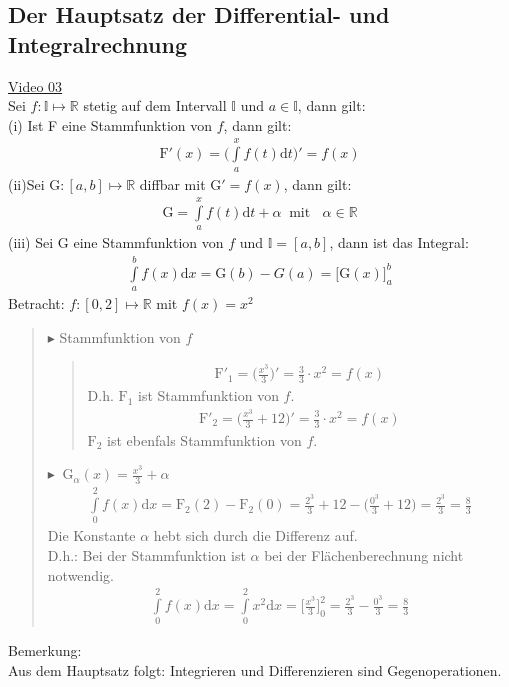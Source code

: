 \subsection{Der Hauptsatz der Differential- und Integralrechnung}
\href{https://youtu.be/2v6KdCjGNc0}{Video 03}\\
Sei $ f: \mathbb{I}\longmapsto \mathbb{R} $ stetig auf dem Intervall $  \mathbb{I} $ und $ a\in \mathbb{I} $, dann gilt:\\
(i) Ist F eine Stammfunktion von $ f $, dann gilt:\\
\begin{align*}
\mathrm{F}'(x)=\bigg(\int\limits_{a}^{x}f(t)\mathrm{d}t \bigg)'=f(x)
\end{align*}
(ii)\;Sei $ \mathrm{G}:[a,b]\longmapsto \mathbb{R} $ diffbar mit $ \mathrm{G}'=f(x) $, dann gilt:\\
\begin{align*}
\mathrm{G}=\int\limits_{a}^{x} f(t)\mathrm{d}t+\alpha\;\;\text{mit }\;\;\alpha\in\mathbb{R}
\end{align*}
(iii)\; Sei G eine Stammfunktion von $ f $ und $  \mathbb{I}=[a,b] $, dann ist das Integral:\\
\begin{align*}
\int\limits_{a}^{b} f(x)\mathrm{d}x=\mathrm{G}(b)-G(a)=\bigg[\mathrm{G}(x)\bigg]^b_a
\end{align*}
\newpage
Betracht: $ f:[0,2]\longmapsto\mathbb{R} $ mit $ f(x)=x^2 $ \\
\begin{quote}
	$\blacktriangleright$ Stammfunktion von $ f $\\
	\begin{quote}
		\begin{align*}
		\mathrm{F}'_1=\bigg(\frac{x^3}{3}\bigg)'=\frac{3}{3}\cdot x^2=f(x)
		\end{align*}
		D.h. $ \mathrm{F}_1 $ ist Stammfunktion von $ f $.
		\begin{align*}
		\mathrm{F}'_2=\bigg(\frac{x^3}{3}+12\bigg)'=\frac{3}{3}\cdot x^2=f(x)
		\end{align*}
		$ \mathrm{F}_2 $ ist ebenfals Stammfunktion von $ f $.
	\end{quote}
	$\blacktriangleright\;\;\mathrm{G}_\alpha(x)=\frac{x^3}{3}+\alpha$ 
	\begin{align*}
	\int\limits_{0}^{2} f(x)\mathrm{d}x=\mathrm{F}_2(2)-\mathrm{F}_2(0)=\frac{2^3}{3}+12-\bigg(\frac{0^3}{3}+12\bigg)=\frac{2^3}{3}=\frac{8}{3}
	\end{align*}
	Die Konstante $ \alpha $ hebt sich durch die Differenz auf.\\
	D.h.: Bei der Stammfunktion ist $ \alpha $ bei der Flächenberechnung nicht notwendig.\\
	\begin{align*}
	\int\limits_{0}^{2} f(x)\mathrm{d}x=\int\limits_{0}^{2} x^2\mathrm{d}x=\bigg[\frac{x^3}{3}\bigg]^2_0=\frac{2^3}{3}-\frac{0^3}{3}=\frac{8}{3}
	\end{align*}
\end{quote}
Bemerkung:\\
Aus dem Hauptsatz folgt: Integrieren und Differenzieren sind Gegenoperationen.\\
